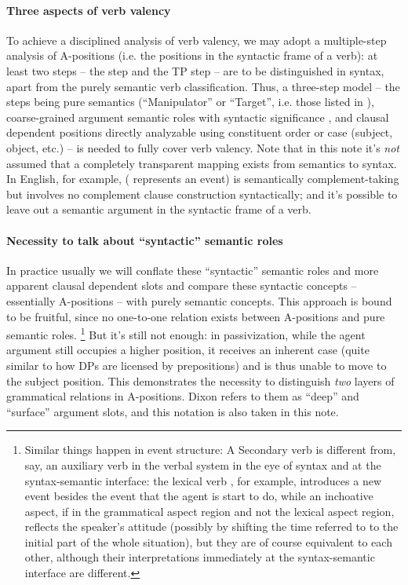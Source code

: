 {\paragraph{Three aspects of verb valency} 
To achieve a disciplined analysis of verb valency, 
we may adopt a multiple-step analysis of A-positions
(i.e. the positions in the syntactic frame of a verb):
at least two steps -- the \vP{} step and the TP step 
-- are to be distinguished in syntax, 
apart from the purely semantic verb classification.
Thus, a three-step model -- 
the steps being pure semantics
(``Manipulator'' or ``Target'', i.e. those listed in \citet{dixon2005semantic}), 
coarse-grained argument semantic roles with syntactic significance 
\citep[]{cgel}, 
and clausal dependent positions directly analyzable using constituent order or case
(subject, object, etc.) -- 
is needed to fully cover verb valency.
Note that in this note it's \emph{not} assumed that 
a completely transparent mapping exists 
from semantics to syntax.
In English, for example,  
( represents an event)
is semantically complement-taking 
but involves no complement clause construction syntactically;
and it's possible to leave out a semantic argument in the syntactic frame of a verb.

\paragraph{Necessity to talk about ``syntactic''  semantic roles} 
In practice usually we will conflate these ``syntactic'' semantic roles 
and more apparent clausal dependent slots 
and compare these syntactic concepts 
-- essentially A-positions -- with purely semantic concepts.
This approach is bound to be fruitful, 
since no one-to-one relation exists between A-positions and pure semantic roles.%
\footnote{
    Similar things happen in event structure: 
    A Secondary verb is different from, say, an auxiliary verb in the verbal system
    in the eye of syntax 
    and at the syntax-semantic interface:
    the lexical verb , for example, 
    introduces a new event besides the event that the agent is start to do, 
    while an inchoative aspect, 
    if in the grammatical aspect region and not the lexical aspect region,
    reflects the speaker's attitude
    (possibly by shifting the time referred to 
    to the initial part of the whole situation),
    but they are of course equivalent to each other,
    although their interpretations 
    immediately at the syntax-semantic interface 
    are different.
}
But it's still not enough: in passivization, 
while the agent argument still occupies a higher position,
it receives an inherent case (quite similar to how DPs are licensed by prepositions)
and is thus unable to move to the subject position.
This demonstrates the necessity to distinguish \emph{two} layers of grammatical relations in A-positions.
Dixon refers to them as ``deep'' and ``surface'' argument slots, 
and this notation is also taken in this note.

}

